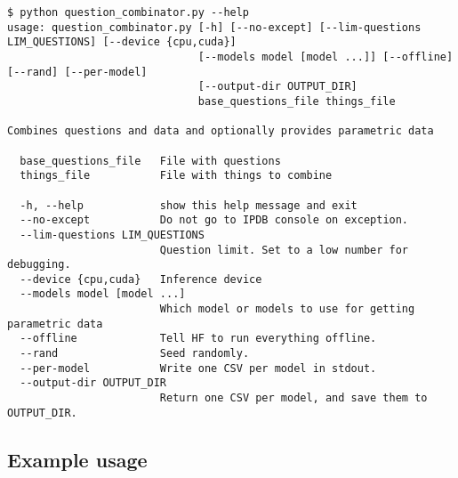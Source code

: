 \begin{lstlisting}
$ python question_combinator.py --help
usage: question_combinator.py [-h] [--no-except] [--lim-questions LIM_QUESTIONS] [--device {cpu,cuda}]
                              [--models model [model ...]] [--offline] [--rand] [--per-model]
                              [--output-dir OUTPUT_DIR]
                              base_questions_file things_file

Combines questions and data and optionally provides parametric data

  base_questions_file   File with questions
  things_file           File with things to combine

  -h, --help            show this help message and exit
  --no-except           Do not go to IPDB console on exception.
  --lim-questions LIM_QUESTIONS
                        Question limit. Set to a low number for debugging.
  --device {cpu,cuda}   Inference device
  --models model [model ...]
                        Which model or models to use for getting parametric data
  --offline             Tell HF to run everything offline.
  --rand                Seed randomly.
  --per-model           Write one CSV per model in stdout.
  --output-dir OUTPUT_DIR
                        Return one CSV per model, and save them to OUTPUT_DIR.
\end{lstlisting}

\subsection{Example usage}
